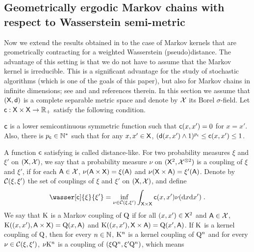 \documentclass[sn-mathphys,Numbered]{sn-jnl}%
\begin{document}
\subsection{Geometrically ergodic Markov chains with respect to Wasserstein semi-metric}
\label{sec:geom-ergod-mark}
Now we extend the results obtained in  to the case of Markov kernels that are geometrically contracting for a weighted Wasserstein (pseudo)distance. The advantage of this setting is that we do not have to assume that the Markov kernel is irreducible. This is a significant advantage for the study of stochastic algorithms (which is one of the goals of this paper), but also for Markov chains in infinite dimensions; see \cite{hairer2011asymptotic,hairer:stuart:vollmer:2012,butkovsky:veretennikov:2013} and \cite[Chapter~20]{douc:moulines:priouret:soulier:2018} and references therein.
In this section we assume that $(\mathsf{X},\mathsf{d})$ is a complete separable metric space and denote by $\mathcal{X}$ its Borel $\sigma$-field. Let $\mathsf{c}:\mathsf{X}\times\mathsf{X}\to\mathbb{R}_+$ satisfy the following condition.
\begin{assumptionC}
  \label{ass:cost_fun}
$\mathsf{c}$ is a lower semicontinuous symmetric function such that $\mathsf{c}(x,x')=0$ for $x=x'$. Also, there is $p_{\mathsf{c}} \in\mathbb{N}^*$ such that for any $x,x'\in\mathsf{X}$, $(\mathsf{d}(x,x') \wedge 1)^{p_{\mathsf{c}}} \leq \mathsf{c}(x,x') \leq 1$.
\end{assumptionC}
A function $\mathsf{c}$ satisfying  is called distance-like.
For two probability measures $\xi$ and
$\xi'$ on $(\mathsf{X},\mathcal{X})$, we say that a probability measure $\nu$ on $(\mathsf{X}^2,\mathcal{X}^{\otimes 2})$ is a coupling of $\xi$ and $\xi'$, if for each $\mathsf{A} \in \mathcal{X}$, $\nu(\mathsf{A} \times \mathsf{X}) = \xi(\mathsf{A})$ and $\nu( \mathsf{X} \times \mathsf{A}) = \xi'(\mathsf{A})$.
Denote by
$\mathcal{C}(\xi,\xi')$  the set of couplings of $\xi$ and
$\xi'$ on $(\mathsf{X},\mathcal{X})$,  and define
\begin{align*}
  \wasser[\cost]{\xi}{\xi'} = \inf_{\nu \in \couplingmeasure(\xi,\xi')} \int_{\Xset\times\Xset} \cost(x,x')
  \nu(\rmd x\rmd x')  \eqsp .
\end{align*}
We say that ${\rm K}$ is a Markov coupling of ${\rm Q}$ if for all $(x,x') \in \mathsf{X}^2$ and $\mathsf{A} \in \mathcal{X}$, ${\rm K}((x, x'), \mathsf{A} \times \mathsf{X}) = {\rm Q} (x, \mathsf{A})$ and ${\rm K}((x,x'), \mathsf{X} \times \mathsf{A}) = {\rm Q}(x',\mathsf{A})$.
If ${\rm K}$ is a kernel coupling of ${\rm Q}$, then for every $n \in \mathbb{N}$, ${\rm K}^n$ is a kernel coupling of ${\rm Q} ^n$ and for every $\nu \in \mathcal{C} (\xi,\xi')$, $\nu {\rm K}^n$ is a coupling of $(\xi {\rm Q} ^n,\xi'{\rm Q}^n)$, which means
\end{document}
